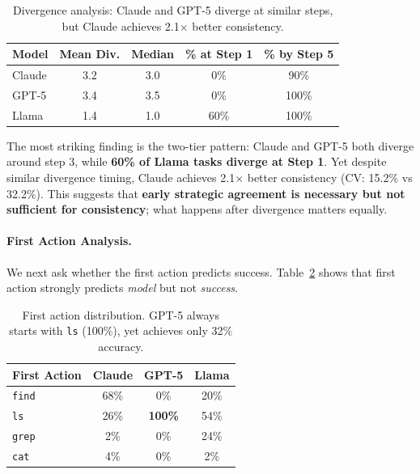 \documentclass{article}
\begin{document}
\begin{table}[t]
\caption{Divergence analysis: Claude and GPT-5 diverge at similar steps, but Claude achieves 2.1$\times$ better consistency.}
\label{tab:divergence}
\vskip 0.1in
\begin{center}
\begin{small}
\begin{tabular}{lcccc}
\toprule
Model & Mean Div. & Median & \% at Step 1 & \% by Step 5 \\
\midrule
Claude & 3.2 & 3.0 & 0\% & 90\% \\
GPT-5 & 3.4 & 3.5 & 0\% & 100\% \\
Llama & 1.4 & 1.0 & 60\% & 100\% \\
\bottomrule
\end{tabular}
\end{small}
\end{center}
\vskip -0.1in
\end{table}

The most striking finding is the two-tier pattern: Claude and GPT-5 both diverge around step 3, while \textbf{60\% of Llama tasks diverge at Step 1}. Yet despite similar divergence timing, Claude achieves 2.1$\times$ better consistency (CV: 15.2\% vs 32.2\%). This suggests that \textbf{early strategic agreement is necessary but not sufficient for consistency}; what happens after divergence matters equally.

\paragraph{First Action Analysis.} We next ask whether the first action predicts success. Table~\ref{tab:first_action} shows that first action strongly predicts \textit{model} but not \textit{success}.

\begin{table}[t]
\caption{First action distribution. GPT-5 always starts with \texttt{ls} (100\%), yet achieves only 32\% accuracy.}
\label{tab:first_action}
\vskip 0.1in
\begin{center}
\begin{small}
\begin{tabular}{lccc}
\toprule
First Action & Claude & GPT-5 & Llama \\
\midrule
\texttt{find} & 68\% & 0\% & 20\% \\
\texttt{ls} & 26\% & \textbf{100\%} & 54\% \\
\texttt{grep} & 2\% & 0\% & 24\% \\
\texttt{cat} & 4\% & 0\% & 2\% \\
\bottomrule
\end{tabular}
\end{small}
\end{center}
\vskip -0.1in
\end{table}
\end{document}
